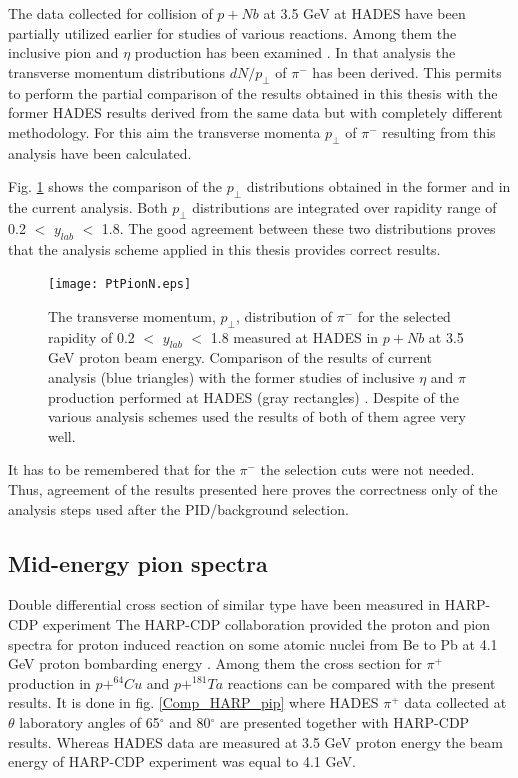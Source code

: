 The data collected for collision of $p+Nb$ at 3.5 GeV at HADES have been partially utilized earlier for studies 
of various reactions. Among them the inclusive pion and $\eta$ production has been examined \cite{AgakishievPionP}. 
In that analysis the transverse momentum distributions $dN/p_{\bot}$ 
of $\pi^{-}$ has been derived. 
This permits to perform the partial comparison of the results obtained in this thesis with the former HADES results derived from the same data but with completely different methodology. For this aim the transverse 
momenta $p_{\bot}$ of $\pi^{-}$ resulting from this analysis have been calculated.

Fig. \ref{Comp_HADES_pt1} shows the comparison of the $p_{\bot}$ distributions obtained in the former and in the current analysis. 
Both $p_{\bot}$ distributions are integrated over rapidity 
range of 0.2 $<$ $y_{lab}$ $<$ 1.8.  
The good agreement between these two distributions proves that the analysis scheme applied in this thesis provides correct results.

\begin{figure}[!h]
\centering
	\texttt{[image: PtPionN.eps]}%
	\caption{\label{Comp_HADES_pt1} 
		The transverse momentum, $p_{\bot}$, distribution of $\pi^{-}$ for the selected rapidity of 0.2 $<$ $y_{lab}$ $<$ 1.8 measured at HADES in $p+Nb$ at 3.5 GeV proton beam energy.
		Comparison of the results of current analysis (blue triangles) with the former studies of inclusive $\eta$ and $\pi$ production performed at HADES 
		(gray rectangles) \cite{AgakishievPionP}. 
		Despite of the various analysis schemes used the results of both of them agree very well.
	}
\end{figure}

It has to be remembered that for the $\pi^{-}$ the selection cuts 
were not needed. 
Thus, agreement of the results presented here 
proves the correctness only of the analysis steps used after the PID/background selection. 

\subsection{\label{pion_data} Mid-energy pion spectra}

Double differential cross section of similar type have been 
measured in HARP-CDP experiment %
The HARP-CDP collaboration provided the proton and pion spectra for proton induced reaction on some atomic nuclei from Be to Pb 
at 4.1 GeV proton bombarding energy  \cite{HARP_CDP_Be1_2009,HARP_CDP_Be2_2009,HARP_CDP_Ta_2009,HARP_CDP_Cu_2009,HARP_CDP_C_2010,HARP_CDP_Sn_2011,HARP_CDP_Al_2012}
. 
Among them the cross section 
for $\pi^{+}$ production in $p + ^{64}Cu$ \cite{HARP_CDP_Cu_2009} and $p + ^{181}Ta$ \cite{HARP_CDP_Ta_2009} reactions can be compared with the present results. It is done in fig. \ref{Comp_HARP_pip} where 
HADES $\pi^{+}$ data collected at $\theta$ laboratory 
angles of 65$^{\circ}$ and 80$^{\circ}$ are presented together with   
HARP-CDP results. Whereas HADES data are measured at 3.5 GeV proton energy the beam energy of HARP-CDP experiment was equal to 4.1 GeV.

